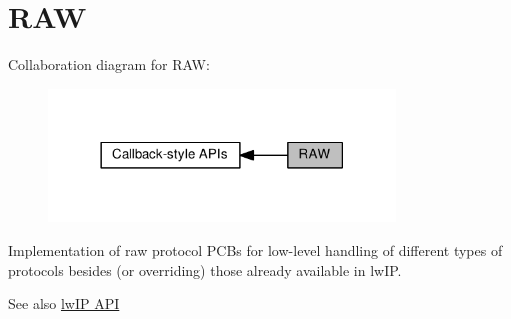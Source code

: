 \hypertarget{group__raw__raw}{}\section{R\+AW}
\label{group__raw__raw}
Collaboration diagram for R\+AW\+:
\nopagebreak
\begin{figure}[H]
\begin{center}
\leavevmode
\includegraphics[width=261pt]{group__raw__raw}
\end{center}
\end{figure}
Implementation of raw protocol P\+C\+Bs for low-\/level handling of different types of protocols besides (or overriding) those already available in lw\+IP.~\newline
\begin{DoxySeeAlso}{See also}
\hyperlink{raw_api}{lw\+IP A\+PI} 
\end{DoxySeeAlso}
